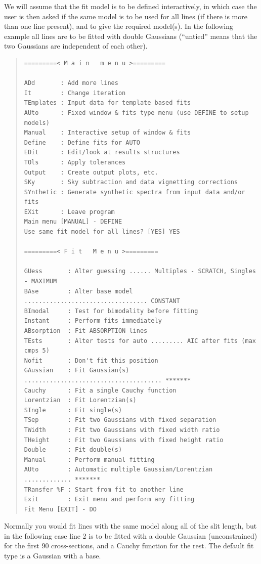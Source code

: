 \documentclass[11pt,twoside]{article}
\begin{document}
We will assume that the fit model is to be defined
interactively, in which case the user is then asked if the same
model is to be used for all lines (if there is more than one line
present), and to give the required model(s).
In the following example all lines are to be fitted with double
Gaussians (``untied'' means that the two Gaussians are independent of
each other).

\begin{quote}\begin{small}\begin{verbatim}
=========< M a i n   m e n u >=========

ADd       : Add more lines
It        : Change iteration
TEmplates : Input data for template based fits
AUto      : Fixed window & fits type menu (use DEFINE to setup models)
Manual    : Interactive setup of window & fits
Define    : Define fits for AUTO
EDit      : Edit/look at results structures
TOls      : Apply tolerances
Output    : Create output plots, etc.
SKy       : Sky subtraction and data vignetting corrections
SYnthetic : Generate synthetic spectra from input data and/or fits
EXit      : Leave program
Main menu [MANUAL] - DEFINE
Use same fit model for all lines? [YES] YES

=========< F i t   M e n u >=========

GUess       : Alter guessing ...... Multiples - SCRATCH, Singles - MAXIMUM
BAse        : Alter base model .................................. CONSTANT
BImodal     : Test for bimodality before fitting
Instant     : Perform fits immediately
ABsorption  : Fit ABSORPTION lines
TEsts       : Alter tests for auto ......... AIC after fits (max cmps 5)
Nofit       : Don't fit this position
GAussian    : Fit Gaussian(s) ...................................... *******
Cauchy      : Fit a single Cauchy function
Lorentzian  : Fit Lorentzian(s)
SIngle      : Fit single(s)
TSep        : Fit two Gaussians with fixed separation
TWidth      : Fit two Gaussians with fixed width ratio
THeight     : Fit two Gaussians with fixed height ratio
Double      : Fit double(s)
Manual      : Perform manual fitting
AUto        : Automatic multiple Gaussian/Lorentzian ............. *******
TRansfer %F : Start from fit to another line
Exit        : Exit menu and perform any fitting
Fit Menu [EXIT] - DO
\end{verbatim}\end{small}\end{quote}

Normally you would fit lines with the same model along all of
the slit length, but in the following case line 2 is to be fitted with a
double Gaussian (unconstrained) for the first 90 cross-sections, and a
Cauchy function for the rest.
The default fit type is a Gaussian with a base.
\end{document}
